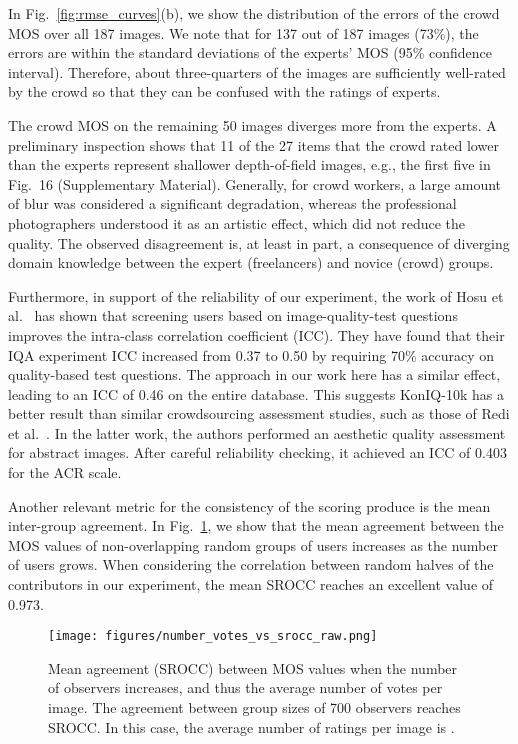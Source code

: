 \documentclass[10pt,journal,compsoc]{IEEEtran}
\begin{document}
In Fig.~\ref{fig:rmse_curves}(b), we show the distribution of the errors of the crowd MOS over all 187 images. We note that for 137 out of 187 images (73\%), the errors are within the  standard deviations of the experts' MOS (95\% confidence interval). Therefore, about three-quarters of the images are sufficiently well-rated by the crowd so that they can be confused with the ratings of experts.

The crowd MOS on the remaining 50 images diverges more from the experts. A preliminary inspection shows that 11 of the 27 items that the crowd rated lower than the experts represent shallower depth-of-field images, e.g., the first five in Fig.~16 (Supplementary Material). 
Generally, for crowd workers, a large amount of blur was considered a significant degradation, whereas the professional photographers understood it as an artistic effect, which did not reduce the quality. The observed disagreement is, at least in part, a consequence of diverging domain knowledge between the expert (freelancers) and novice (crowd) groups.



Furthermore, in support of the reliability of our experiment, the work of Hosu et al.\ \cite{QoMEXReliability} has shown that screening users based on image-quality-test questions improves the intra-class correlation coefficient (ICC). They have found that their IQA experiment ICC increased from 0.37 to 0.50 by requiring 70\% accuracy on quality-based test questions. The approach in our work here has a similar effect, leading to an ICC of 0.46 on the entire database. This suggests KonIQ-10k has a better result than similar crowdsourcing assessment studies, such as those of Redi et al.~\cite{siahaan_reliable_2016}. In the latter work, the authors performed an aesthetic quality assessment for abstract images. After careful reliability checking, it achieved an ICC of 0.403 for the ACR scale.


Another relevant metric for the consistency of the scoring produce is the mean inter-group agreement. In Fig.\ \ref{fig:group-agreement}, we show that the mean agreement between the MOS values of non-overlapping random groups of users increases as the number of users grows. When considering the correlation between random halves of the contributors in our experiment, the mean SROCC reaches an excellent value of 0.973.

\begin{figure}[!t]
\centering
\texttt{[image: figures/number\_votes\_vs\_srocc\_raw.png]}
\caption{Mean agreement (SROCC) between MOS values when the number of observers increases, and thus the average number of votes per image. The agreement between group sizes of 700 observers reaches  SROCC. In this case, the average number of ratings per image is .}
\label{fig:group-agreement}
\end{figure}
\end{document}
